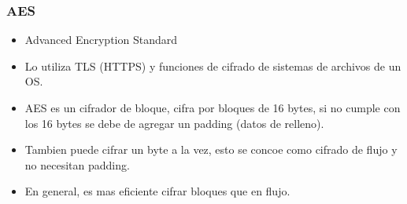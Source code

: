 \documentclass[11pt]{article}
\begin{document}
\subsubsection{AES}
\label{sec:org8fbe865}
\begin{itemize}
\item Advanced Encryption Standard
\item Lo utiliza TLS (HTTPS) y funciones de cifrado de sistemas de archivos de un OS.
\item AES es un cifrador de bloque, cifra por bloques de 16 bytes, si no cumple con los 16 bytes se debe de agregar un padding (datos de relleno).
\item Tambien puede cifrar un byte a la vez, esto se concoe como cifrado de flujo y no necesitan padding.
\item En general, es mas eficiente cifrar bloques que en flujo.
\end{itemize}
\end{document}
